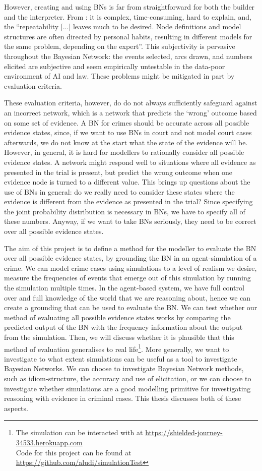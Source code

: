 \documentclass[12pt]{article}
\begin{document}
However, creating and using BNs is far from straightforward for both the builder and the interpreter. From \citet{deKoeijer2020}: it is complex, time-consuming, hard to explain, and, the ``repeatability [...] leaves much to be desired. Node definitions and model structures are often directed by personal habits, resulting in different models for the same problem, depending on the expert''. This subjectivity is pervasive throughout the Bayesian Network: the events selected, arcs drawn, and numbers elicited are subjective and seem empirically untestable in the data-poor environment of AI and law. These problems might be mitigated in part by evaluation criteria. 

These evaluation criteria, however, do do not always sufficiently safeguard against an incorrect network, which is a network that predicts the `wrong' outcome based on some set of evidence. A BN for crimes should be accurate across all possible evidence states, since, if we want to use BNs in court and not model court cases afterwards, we do not know at the start what the state of the evidence will be. However, in general, it is hard for modellers to rationally consider all possible evidence states. A network might respond well to situations where all evidence as presented in the trial is present, but predict the wrong outcome when one evidence node is turned to a different value. This brings up questions about the use of BNs in general: do we really need to consider these states where the evidence is different from the evidence as presented in the trial? Since specifying the joint probability distribution is necessary in BNs, we have to specify all of these numbers. Anyway, if we want to take BNs seriously, they need to be correct over all possible evidence states.

 The aim of this project is to define a method for the modeller to evaluate the BN over all possible evidence states, by grounding the BN in an agent-simulation of a crime. We can model crime cases using simulations to a level of realism we desire, measure the frequencies of events that emerge out of this simulation by running the simulation multiple times. In the agent-based system, we have full control over and full knowledge of the world that we are reasoning about, hence we can create a grounding that can be used to evaluate the BN. We can test whether our method of evaluating all possible evidence states works by comparing the predicted output of the BN with the frequency information about the output from the simulation. Then, we will discuss whether it is plausible that this method of evaluation generalises to real life\footnote{The simulation can be interacted with at \url{https://shielded-journey-34533.herokuapp.com} \\ Code for this project can be found at \url{https://github.com/aludi/simulationTest}}. More generally, we want to investigate to what extent simulations can be useful as a tool to investigate Bayesian Networks. We can choose to investigate Bayesian Network methods, such as idiom-structure, the accuracy and use of elicitation, or we can choose to investigate whether simulations are a good modelling primitive for investigating reasoning with evidence in criminal cases. This thesis discusses both of these aspects.
 
\end{document}
